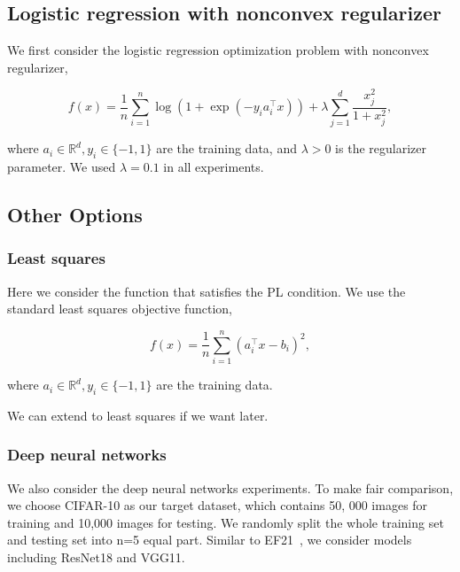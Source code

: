 \documentclass{article} %
\newcommand{\algname}[1]{{\sf\green\relscale{0.90}#1}\xspace}
\theoremstyle{plain}
\theoremstyle{definition}
\theoremstyle{remark}
\newcommand{\green}{\color{mydarkgreen}}
\begin{document}
\subsection{Logistic regression with nonconvex regularizer}
We first consider the logistic regression optimization problem with nonconvex regularizer, 

\begin{equation}
   f(x)=\frac{1}{n} \sum_{i=1}^{n} \log \left(1+\exp \left(-y_{i} a_{i}^{\top} x\right)\right)+\lambda \sum_{j=1}^{d} \frac{x_{j}^{2}}{1+x_{j}^{2}}, 
\end{equation}

where $a_{i} \in \mathbb{R}^{d}, y_{i} \in\{-1,1\}$ are the training data, and $\lambda>0$ is the regularizer parameter. We used $\lambda=0.1$ in all experiments.

\subsection{Other Options}
\subsubsection{Least squares}
Here we consider the function that satisfies the PL condition. We use the standard least squares objective function, 

\begin{equation}
   f(x)=\frac{1}{n} \sum_{i=1}^{n}\left(a_{i}^{\top} x-b_{i}\right)^{2},
\end{equation}

where $a_{i} \in \mathbb{R}^{d}, y_{i} \in\{-1,1\}$ are the training data.

We can extend to least squares if we want later. 

\subsubsection{Deep neural networks}
We also consider the deep neural networks experiments. To make fair comparison, we choose CIFAR-10 as our target dataset, which contains 50, 000 images for training and 10,000 images for testing. We randomly split the whole training set and testing set into n=5 equal part. Similar to \algname{EF21}~\cite{ric21}, we consider models including ResNet18 and VGG11. 
\end{document}
